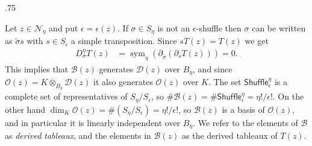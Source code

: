 \documentclass[11pt,fleqn]{article}
\makeatletter
\renewenvironment{proof}[1][\textit{Proof}]{\par
  \pushQED{\qed}%
  \normalfont \topsep.75\paraskip\relax
  \trivlist
  \item[\hskip\labelsep
        \itshape
    #1\@addpunct{.}]\ignorespaces
}{%
  \popQED\endtrivlist\@endpefalse
}
\newcommand\DD{\mathcal D}
\newcommand\N{\mathcal N}
\renewcommand\O{\mathcal O}
\newcommand\ot{\otimes}
\newcommand\Shuffle{\mathsf{Shuffle}}
\DeclareMathOperator\sym{sym}
\makeatother
\begin{document}
\begin{proof}
Let $z \in \N_\eta$ and put $\epsilon = \epsilon(z)$. If $\sigma \in S_\eta$ 
is not an $\epsilon$-shuffle then $\sigma$ can be written as $\tilde \sigma s$ 
with $s \in S_{\epsilon}$ a simple transposition. Since $s T(z) = T(z)$
we get
\begin{align*}
D_\sigma^\eta T(z) 
  &= \sym_\eta (\partial_{\tilde \sigma} (\partial_s T(z))) = 0.
\end{align*}
This implies that $\mathcal B(z)$ generates $\DD(z)$ over $B_\eta$, and
since $\O(z) = K \ot_{B_\eta} \DD(z)$ it also generates $\O(z)$ over $K$.
The set $\Shuffle_{\epsilon}^\eta$ is a complete set of representatives of 
$S_\eta / S_{\epsilon}$, so $\# \mathcal B(z) = \# \Shuffle_{\epsilon}^\eta = 
\eta!/\epsilon!$. On the other hand $\dim_K \O(z) = \# (S_\eta / S_\epsilon) = 
\eta!/\epsilon!$, so $\mathcal B(z)$ is a basis of $\O(z)$, and in particular
it is linearly independent over $B_\eta$. 
\end{proof}
We refer to the elements of $\mathcal B$ as \emph{derived tableaux}, and the
elements in $\mathcal B(z)$ as the derived tableaux of $T(z)$.
\end{document}
